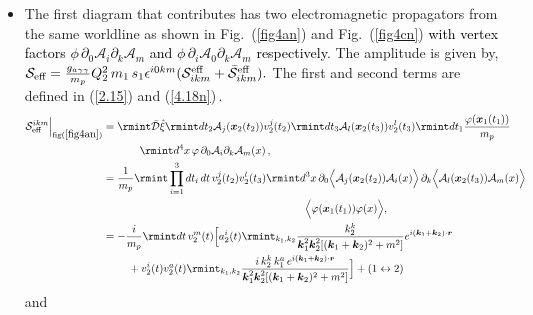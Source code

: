 \begin{itemize}
\item The first diagram that contributes has two electromagnetic propagators from the same worldline as shown in Fig.~(\ref{fig4an}) and Fig.~(\ref{fig4cn}) \textcolor{black}{with vertex factors $\phi\,\partial_{0}\mathcal{A}_{i}\partial_{k}\mathcal{A}_{m}$ and $\phi\,\partial_{i}\mathcal{A}_{0}\partial_{k}\mathcal{A}_{m}$ respectively}. The amplitude is given by, $  \mathcal{S}_{\text{eff}}=\frac{g_{a\gamma\gamma}}{m_p}Q_2^2\,m_1\,s_1\epsilon^{i0km}(  \mathcal{S}^{\text{eff}}_{ikm}+\Bar{  \mathcal{S}}^{\text{eff}}_{ikm}).$ The first and second terms are defined in (\ref{2.15}) and (\ref{4.18n})\,.
\begin{align}
   \begin{split}
      \mathcal{S}_{\text{eff}}^{ikm}\Big|_{\text{fig}(\ref{fig4an})}&=\rmint \Bar{\mathcal{D}}\hat{\xi}\rmint dt_2  \mathcal{A}_{j}(\boldsymbol{x}_2(t_2))v_{2}^{j}(t_2)\rmint dt_{3}  \mathcal{A}_{l}(\boldsymbol{x}_2(t_3))v_2^l(t_3)\rmint dt_1  \frac{\varphi(\boldsymbol{x}_1(t_1))}{m_p}\\ &
      \hspace{1.2 cm}\rmint d^4x\,  \varphi\,\partial_0  \mathcal{A}_{i}\partial_{k}\mathcal{A}_{m}(x)\,, \\ &
    =\frac{1}{m_p}\rmint \prod_{i=1}^{3}dt_i\,  dt\, v_{2}^{j}(t_2) v_2^l(t_3) \rmint d^3x\, \partial_{0}\Big\langle \mathcal{A}_{j}(\boldsymbol{x}_2(t_2))\mathcal{A}_{i}(x)\Big\rangle\,\partial_{k}\boldsymbol{\Big\langle}\mathcal{A}_{l}(\boldsymbol{x}_2(t_3))\mathcal{A}_{m}(x)\Big\rangle\,\\&\hspace{6.6cm}\Big\langle\varphi(\boldsymbol{x}_1(t_1))\varphi({x})\Big\rangle,\\ &
     =-\frac{i}{m_p}\rmint dt \,v_2^{m}(t)\Big[a_{2}^{i}(t)\rmint_{k_1,k_2}\frac{k_2^{k}}{\boldsymbol{k}_1^2\boldsymbol{k}_2^2[(\boldsymbol{k}_1+\boldsymbol{k}_2)^2+m^2]}e^{i(\boldsymbol{k}_1+\boldsymbol{k}_2)\cdot \boldsymbol{r}}\\ &
   \,\,\,\,\,\,\,\,\,\,\,\,\,\,  +v_2^{i}(t)v_2^{a}(t)\rmint_{k_1,k_2}\frac{i\,k_2^k\,k_1^a\,e^{i(\boldsymbol{k}_1+\boldsymbol{k}_2)\cdot \boldsymbol{r}}}{\boldsymbol{k}_1^2\boldsymbol{k}_2^2[(\boldsymbol{k}_1+\boldsymbol{k}_2)^2+m^2]}\Big]
   +(1\leftrightarrow 2)
   \label{2.15}
    \end{split}
\end{align}
and
\begin{align}
    \begin{split}

\end{split}
\end{align}
\end{itemize}

